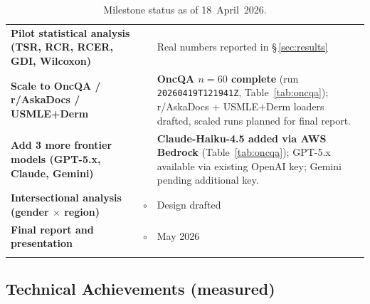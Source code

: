 \documentclass[11pt,a4paper]{article}
\newcommand{\statusdone}{\textcolor{donegray}{\checkmark}}
\newcommand{\statusprog}{\textcolor{proggray}{\textbullet}}
\newcommand{\statuspend}{\textcolor{pendinggray}{$\circ$}}
\begin{document}
{\begin{longtable}{@{}>{\bfseries}p{5.2cm} c p{\dimexpr\linewidth-5.2cm-1.4cm-6\tabcolsep}@{}}
\rowcolor{rowalt}
Pilot statistical analysis (TSR, RCR, RCER, GDI, Wilcoxon) & \statusdone & Real numbers reported in \S\,\ref{sec:results}\\
Scale to OncQA / r/AskaDocs / USMLE+Derm & \statusprog & \textbf{OncQA $n=60$ complete} (run \texttt{20260419T121941Z}, Table~\ref{tab:oncqa}); r/AskaDocs + USMLE+Derm loaders drafted, scaled runs planned for final report.\\
\rowcolor{rowalt}
Add 3 more frontier models (GPT-5.x, Claude, Gemini) & \statusprog & \textbf{Claude-Haiku-4.5 added via AWS Bedrock} (Table~\ref{tab:oncqa}); GPT-5.x available via existing OpenAI key; Gemini pending additional key.\\
Intersectional analysis (gender $\times$ region) & \statuspend & Design drafted\\
\rowcolor{rowalt}
Final report and presentation & \statuspend & May 2026\\
\caption{Milestone status as of 18~April~2026.}\\
\end{longtable}}

\subsection{Technical Achievements (measured)}
\end{document}
